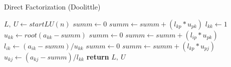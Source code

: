 \documentclass{article}
\begin{document}
  \begin{algorithm}
    \caption{Direct Factorization (Doolittle)}
    \begin{algorithmic}[1]
        \State $L,\ U \gets startLU(n)$
          \State $summ \gets 0$
            \State $summ \gets summ + (l_{kp} * u_{pk})$
          \EndFor
          \State $l_{kk} \gets 1$
          \State $u_{kk} \gets root(a_{kk} - summ)$
            \State $summ \gets 0$
              \State $summ \gets summ + (l_{ip} * u_{pk})$
            \EndFor
            \State $l_{ik} \gets (a_{ik} - summ) / u_{kk}$
          \EndFor
            \State $summ \gets 0$
              \State $summ \gets summ + (l_{kp} * u_{pj})$
            \EndFor
            \State $u_{kj} \gets (a_{kj} - summ) / l_{kk}$
          \EndFor
        \EndFor
        \State \textbf{return} $L,\ U$
      \EndProcedure
    \end{algorithmic}
  \end{algorithm}
\end{document}

